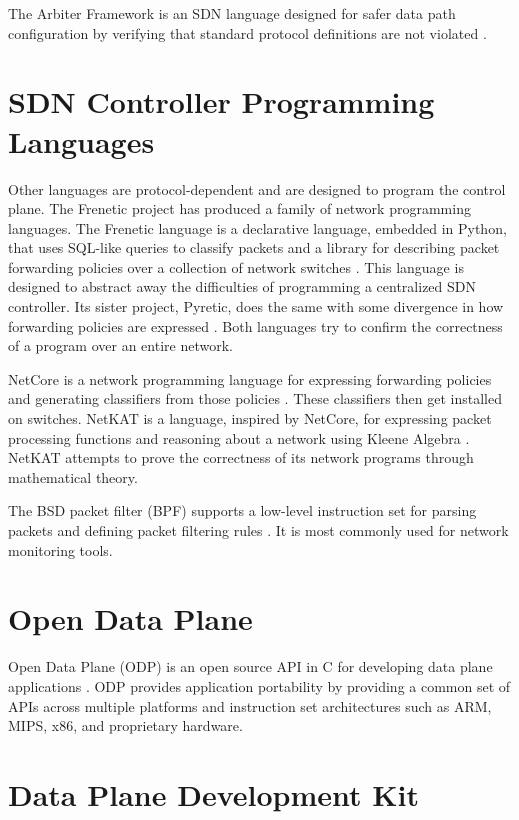 The Arbiter Framework is an SDN language designed for safer data path configuration by verifying that standard protocol definitions are not violated \cite{noproto1}.

\section{SDN Controller Programming Languages} \label{rel:frenetic}

Other languages are protocol-dependent and are designed to program the control plane. The Frenetic project has produced a family of network programming
languages. The Frenetic language is a declarative language, embedded in Python,
that uses SQL-like queries to classify packets and a library for describing
packet forwarding policies over a collection of network switches
\cite{foster2011frenetic, foster2013frenetic}. This language is designed to
abstract away the difficulties of programming a centralized SDN controller. Its
sister project, Pyretic, does the same with some divergence in how forwarding
policies are expressed \cite{modularpyretic}. Both languages try to confirm the correctness of a program over an entire network.

NetCore is a network programming language for expressing forwarding policies and
generating classifiers from those policies \cite{monsanto2012netcore}. These
classifiers then get installed on switches. NetKAT is a language, inspired by
NetCore, for expressing packet processing functions and reasoning about a
network using Kleene Algebra \cite{kozen2014netkat, anderson2014netkat}. NetKAT
attempts to prove the correctness of its network programs through mathematical theory.

The BSD packet filter (BPF) supports a low-level instruction set for parsing packets and defining packet filtering rules \cite{bpf1993mccanne}. It is most commonly used for network monitoring tools.

\section{Open Data Plane}
\label{rel:odp}

Open Data Plane (ODP) is an open source API in C for developing data plane applications \cite{odp_webpage}. ODP provides application portability by providing a common set of APIs across multiple platforms and instruction set architectures such as ARM, MIPS, x86, and proprietary hardware.

\section{Data Plane Development Kit}
\label{rel:odp}

